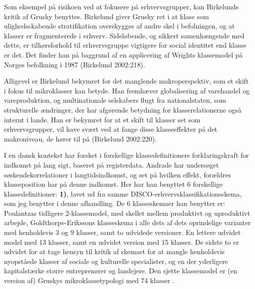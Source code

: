 Som eksempel på risikoen ved at fokusere på erhvervsgrupper, kan Birkelunds kritik af Grusky benyttes. Birkelund giver Grusky ret i at klase som ulighedsskabende stratifikation overskygges af andre skel i befolningen, og at klasser er fragmenterede i erhverv. Sideløbende, og sikkert samenhængende med dette, er tilhørsforhold til erhvervsgruppe vigtigere for social identitet end klasse er det. Det finder han på baggrund af en applicering af Wrights klassemodel på Norges befolkning i 1987 (Birkelund 2002:218). 

Alligevel er Birkelund bekymret for det manglende makroperspektiv, som et skift i fokus til mikroklasser kan betyde. Han fremhæver globalisering af varehandel og vareproduktion, og multinationale selskabers flugt fra nationalstaten, som strukturelle ændringer, der har afgørende betydning for klasserelationerne også internt i lande. Han er bekymret for at et skift til klasser set som erhvervsgrupper, vil have svært ved at fange disse klasseeffekter på det makroniveau, de hører til på (Birkelund 2002:220). 

I en dansk kontekst har \textcite{Andrade2014} forsket i forskellige klassedefinitioners forklaringskraft for indkomst på lang sigt, baseret på registerdata. %
Andrade har undersøget søskendekorrelationer i langtidsindkomst, og set på hvilken effekt, forældres klasseposition har på denne indkomst. Her har han benyttet 6 forskellige klassedefinitioner: \textbf{1)}, lavet ud fra samme DISCO-erhvervsklassifikationsskema, som jeg benytter i denne afhandling. De 6 klasseskemaer han benytter er: Poulantzas tidligere 2-klassemodel, med skellet mellem produktivt og uproduktivt arbejde, Goldthorpe-Erikssons klasseskema i alle dets af dets oprindelige varianter med henholdsvis 3 og 9 klasser, samt to udvidede versioner. En lettere udvidet model med 13 klasser, samt en udvidet version med 15 klasser. De sidste to er udvidet for at tage hensyn til kritik af skemaet for at mangle henholdsvis nyopståede klasser af sociale og kulturelle specialister, og en der yderligere kapitalstærke større entreprenører og landejere. Den sjette klassemodel er (en version af) Gruskys mikroklassetypologi med 74 klasser \parencite[93f]{Andrade2014}.

